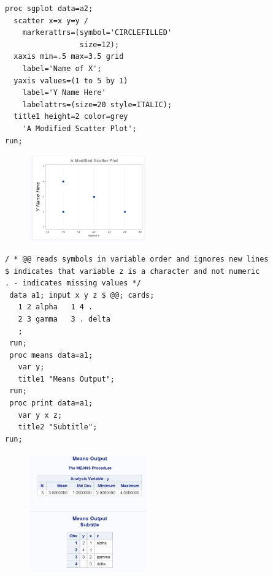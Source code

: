\documentclass[12pt]{notes}
\begin{document}
\begin{verbatim}
proc sgplot data=a2;
  scatter x=x y=y /
    markerattrs=(symbol='CIRCLEFILLED'
                 size=12);
  xaxis min=.5 max=3.5 grid
    label='Name of X';
  yaxis values=(1 to 5 by 1) 
    label='Y Name Here'
    labelattrs=(size=20 style=ITALIC);
  title1 height=2 color=grey 
    'A Modified Scatter Plot';
run;
\end{verbatim}

\begin{figure}[H]
\centering
\includegraphics[width = 0.45\textwidth]{figures/module1/sas5.png}
\end{figure}

\begin{verbatim}
/ * @@ reads symbols in variable order and ignores new lines
$ indicates that variable z is a character and not numeric 
. - indicates missing values */
 data a1; input x y z $ @@; cards;
   1 2 alpha   1 4 .
   2 3 gamma   3 . delta
   ;
 run;
 proc means data=a1;
   var y;
   title1 "Means Output";
 run;
 proc print data=a1;
   var y x z;
   title2 "Subtitle";
run;
\end{verbatim}

\begin{figure}[H]
\centering
\includegraphics[width = 0.45\textwidth]{figures/module1/sas6.png}
\end{figure}
\end{document}
